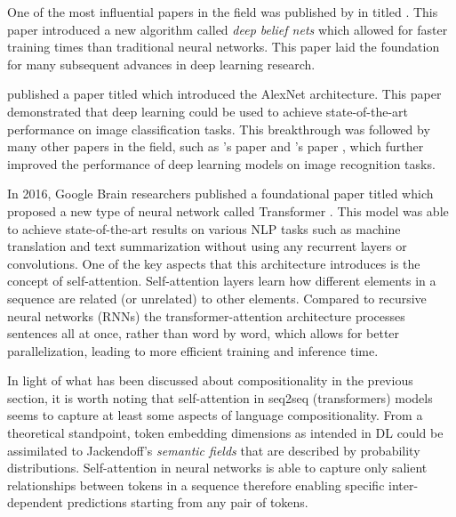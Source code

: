 One of the most influential papers in the field was published by \citeauthor{Hinton2006} in \citeyear{Hinton2006} titled . This paper introduced a new algorithm called \emph{deep belief nets} which allowed for faster training times than traditional neural networks. This paper laid the foundation for many subsequent advances in deep learning research. 

\cite{Krizhevsky2012} published a paper titled  which introduced the AlexNet architecture. This paper demonstrated that deep learning could be used to achieve state-of-the-art performance on image classification tasks. This breakthrough was followed by many other papers in the field, such as \citeauthor{Szegedy2014}'s \citeyear{Szegedy2014} paper  and \citeauthor{He2015}'s \citeyear{He2015} paper , which further improved the performance of deep learning models on image recognition tasks.

In 2016, Google Brain researchers published a foundational paper titled  which proposed a new type of neural network called Transformer \citep{Vaswani2017}. This model was able to achieve state-of-the-art results on various NLP tasks such as machine translation and text summarization without using any recurrent layers or convolutions. One of the key aspects that this architecture introduces is the concept of self-attention. Self-attention layers learn how different elements in a sequence are related (or unrelated) to other elements. Compared to recursive neural networks (RNNs) the transformer-attention architecture processes sentences all at once, rather than word by word, which allows for better parallelization, leading to more efficient training and inference time.

In light of what has been discussed about compositionality in the previous section, it is worth noting that self-attention in seq2seq (transformers) models seems to capture at least some aspects of language compositionality. From a theoretical standpoint, token embedding dimensions as intended in DL could be assimilated to Jackendoff's \emph{semantic fields} that are described by probability distributions. Self-attention in neural networks is able to capture only salient relationships between tokens in a sequence therefore enabling specific inter-dependent predictions starting from any pair of tokens.

